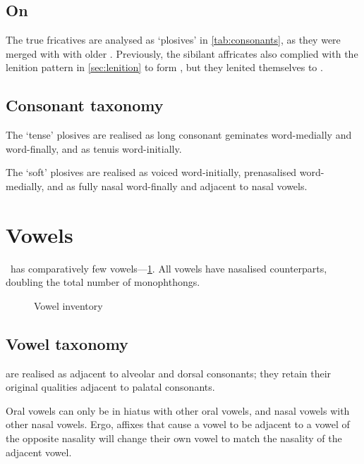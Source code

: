 \subsection{On }
The true fricatives  are analysed as `plosives' in \cref{tab:consonants},
as they were merged with with older . Previously, the sibilant affricates also complied with
the lenition pattern in \cref{sec:lenition} to form , but they lenited themselves to .

\subsection{Consonant taxonomy}
The `tense' plosives  are realised as long consonant
geminates word-medially and word-finally, and as tenuis  word-initially.

The `soft' plosives  are realised as voiced  word-initially,
prenasalised  word-medially, and as fully nasal 
word-finally and adjacent to nasal vowels.

\section{Vowels}
\label{sec:vowels}

\langname~has comparatively few vowels---\cref{fig:vowels}. All vowels have
nasalised counterparts, doubling the total number of monophthongs.

\begin{figure}[htpb]
	\centering
	\begin{vowel}
	\end{vowel}
	\caption{Vowel inventory}
	\label{fig:vowels}
\end{figure}

\subsection{Vowel taxonomy}
 are realised as  adjacent to alveolar and dorsal consonants;
they retain their original qualities adjacent to palatal consonants.

Oral vowels can only be in hiatus with other oral vowels, and nasal vowels with other nasal vowels.
Ergo, affixes that cause a vowel to be adjacent to a vowel of the opposite nasality
will change their own vowel to match the nasality of the adjacent vowel.


